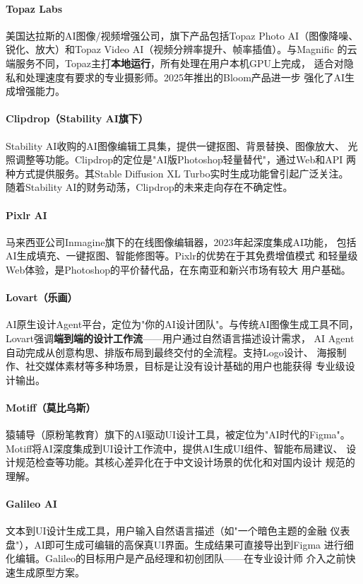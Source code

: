 \paragraph{Topaz Labs}
美国达拉斯的AI图像/视频增强公司，旗下产品包括Topaz Photo AI（图像降噪、
锐化、放大）和Topaz Video AI（视频分辨率提升、帧率插值）。与Magnific
的云端服务不同，Topaz主打\textbf{本地运行}，所有处理在用户本机GPU上完成，
适合对隐私和处理速度有要求的专业摄影师。2025年推出的Bloom产品进一步
强化了AI生成增强能力。

\paragraph{Clipdrop（Stability AI旗下）}
Stability AI收购的AI图像编辑工具集，提供一键抠图、背景替换、图像放大、
光照调整等功能。Clipdrop的定位是"AI版Photoshop轻量替代"，通过Web和API
两种方式提供服务。其Stable Diffusion XL Turbo实时生成功能曾引起广泛关注。
随着Stability AI的财务动荡，Clipdrop的未来走向存在不确定性。

\paragraph{Pixlr AI}
马来西亚公司Inmagine旗下的在线图像编辑器，2023年起深度集成AI功能，
包括AI生成填充、一键抠图、智能修图等。Pixlr的优势在于其免费增值模式
和轻量级Web体验，是Photoshop的平价替代品，在东南亚和新兴市场有较大
用户基础。

\paragraph{Lovart（乐画）}
AI原生设计Agent平台，定位为"你的AI设计团队"。与传统AI图像生成工具不同，
Lovart强调\textbf{端到端的设计工作流}——用户通过自然语言描述设计需求，
AI Agent自动完成从创意构思、排版布局到最终交付的全流程。支持Logo设计、
海报制作、社交媒体素材等多种场景，目标是让没有设计基础的用户也能获得
专业级设计输出。

\paragraph{Motiff（莫比乌斯）}
猿辅导（原粉笔教育）旗下的AI驱动UI设计工具，被定位为"AI时代的Figma"。
Motiff将AI深度集成到UI设计工作流中，提供AI生成UI组件、智能布局建议、
设计规范检查等功能。其核心差异化在于中文设计场景的优化和对国内设计
规范的理解。

\paragraph{Galileo AI}
文本到UI设计生成工具，用户输入自然语言描述（如"一个暗色主题的金融
仪表盘"），AI即可生成可编辑的高保真UI界面。生成结果可直接导出到Figma
进行细化编辑。Galileo的目标用户是产品经理和初创团队——在专业设计师
介入之前快速生成原型方案。

